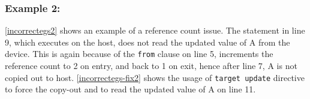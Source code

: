 % 
% 


% 
% 
\subsubsection{Example 2:} 
\autoref{incorrectegs2} shows an example of a reference count issue. 
The statement in line 9, which executes on the host, does not read
the updated value of \textsf{A} from the device. 
This is again because of the \texttt{from} clause on line 5, increments 
the reference count to 2 on entry, and back to 1 on exit, hence 
after line 7, \textsf{A} is not copied out to host.
\autoref{incorrectegs-fix2} shows the usage of \texttt{target update} directive 
to force the copy-out and to read the updated value of \textsf{A} on line 11.

